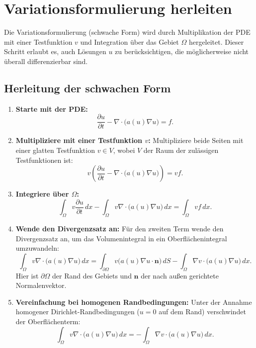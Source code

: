 \section{Variationsformulierung herleiten}
Die Variationsformulierung (schwache Form) wird durch Multiplikation der PDE mit einer Testfunktion $v$ und Integration über das Gebiet $\Omega$ hergeleitet. Dieser Schritt erlaubt es, auch Lösungen $u$ zu berücksichtigen, die möglicherweise nicht überall differenzierbar sind.

\subsection{Herleitung der schwachen Form}
\begin{enumerate}
	\item \textbf{Starte mit der PDE:}
	\begin{equation}
		\frac{\partial u}{\partial t} - \nabla \cdot \big(a(u) \nabla u\big) = f.
	\end{equation}
	
	\item \textbf{Multipliziere mit einer Testfunktion $v$:} Multipliziere beide Seiten mit einer glatten Testfunktion $v \in V$, wobei $V$ der Raum der zulässigen Testfunktionen ist:
	\begin{equation}
		v \left(\frac{\partial u}{\partial t} - \nabla \cdot \big(a(u) \nabla u\big)\right) = v f.
	\end{equation}
	
	\item \textbf{Integriere über $\Omega$:}
	\begin{equation}
		\int_\Omega v \frac{\partial u}{\partial t} \, dx - \int_\Omega v \nabla \cdot \big(a(u) \nabla u\big) \, dx = \int_\Omega v f \, dx.
	\end{equation}
	
	\item \textbf{Wende den Divergenzsatz an:} Für den zweiten Term wende den Divergenzsatz an, um das Volumenintegral in ein Oberflächenintegral umzuwandeln:
	\begin{equation}
		\int_\Omega v \nabla \cdot \big(a(u) \nabla u\big) \, dx = \int_{\partial \Omega} v \big(a(u) \nabla u \cdot \mathbf{n}\big) \, dS - \int_\Omega \nabla v \cdot \big(a(u) \nabla u\big) \, dx.
	\end{equation}
	Hier ist $\partial \Omega$ der Rand des Gebiets und $\mathbf{n}$ der nach außen gerichtete Normalenvektor.
	
	\item \textbf{Vereinfachung bei homogenen Randbedingungen:} Unter der Annahme homogener Dirichlet-Randbedingungen ($u = 0$ auf dem Rand) verschwindet der Oberflächenterm:
	\begin{equation}
		\int_\Omega v \nabla \cdot \big(a(u) \nabla u\big) \, dx = -\int_\Omega \nabla v \cdot \big(a(u) \nabla u\big) \, dx.
	\end{equation}
	

\end{enumerate}
